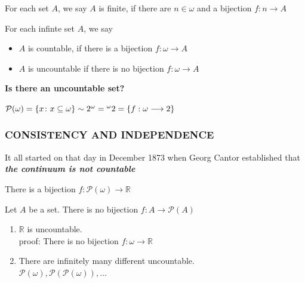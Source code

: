 \documentclass{beamer}
\begin{document}
\begin{frame}
\begin{definition}
For each set $A$, we say $A$ is finite, if there are $n \in \omega$ and a bijection $f:n \longrightarrow A$
\end{definition}
\pause
\begin{definition}
For each infinte set $A$, we say
\begin{itemize}
\item  $A$ is countable, if there is  a bijection $f:\omega \longrightarrow A$
\item $A$ is uncountable if there is no bijection $f:\omega \longrightarrow A$
\end{itemize}
\end{definition}
\vspace{5mm}
\begin{center}
\textbf{{\Large Is there an uncountable set?}}
\end{center}
\pause
\begin{center}
\textbf{{\Large $\mathcal{P}(\omega)=\{x \colon x  \subseteq \omega\} \sim2^{\omega}= \prescript{\omega}{}{2}=\{f: \omega \longrightarrow 2\}$}}
\end{center}
\end{frame}
\begin{frame}
\frametitle{CONSISTENCY AND INDEPENDENCE}
It all started on that day in December 1873 when Georg Cantor established that \textit{\textbf{{\large the continuum is not countable}}}
\pause
\begin{theorem}
There is a bijection $f : \mathcal{P}(\omega) \longrightarrow \mathbb{R}$
\end{theorem}
\pause
\begin{theorem}
Let $A$ be a set. There is no bijection $f:A \longrightarrow \mathcal{P}(A)$
\end{theorem}
\pause
\begin{corollary}
\begin{enumerate}
\item $\mathbb{R}$ is uncountable.\\
proof: There is no bijection $f: \omega \longrightarrow \mathbb{R}$
\item There are infinitely many different uncountable.\\
$\mathcal{P}(\omega), \mathcal{P}(\mathcal{P}(\omega)), \dots $
\end{enumerate}
\end{corollary}
\end{frame}
\end{document}
